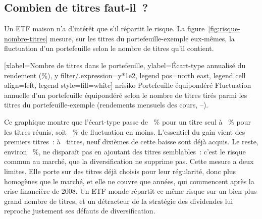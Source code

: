 \subsection{Combien de titres faut-il~?}\label{sec:porte-diversification}

Un ETF maison n'a d'int\'er\^et que s'il r\'epartit le risque. La
figure~\ref{fig:risque-nombre-titres} mesure, sur les titres du portefeuille-exemple eux-m\^emes, la
fluctuation d'un portefeuille selon le nombre de titres qu'il contient.


[xlabel={Nombre de titres dans le portefeuille},
  ylabel={\'Ecart-type annualis\'e du rendement (\%)}, y filter/.expression={y*1e2},
  legend pos=north east, legend cell align=left, legend style={fill=white}]%
  {n}{risiko}%
  {{Portefeuille \'equipond\'er\'e}}%
  {Fluctuation annuelle d'un portefeuille \'equipond\'er\'e selon le nombre de titres tir\'es parmi
  les \NombreTitres{} titres du portefeuille-exemple (rendements mensuels des cours,
  \DonneesDebut--\DonneesFin).\label{fig:risque-nombre-titres}}

Ce graphique montre que l'\'ecart-type passe de \RisqueUnTitre~\% pour un titre seul \`a
\RisqueTousTitres~\% pour les \NombreTitres{} titres r\'eunis, soit \RisqueReductionProzent~\% de
fluctuation en moins. L'essentiel du gain vient des premiers titres~: \`a \TitresNeufDixiemes~titres,
neuf dixi\`emes de cette baisse sont d\'ej\`a acquis. Le reste, environ \RisqueTousTitres~\%, ne
dispara\^it pas en ajoutant des titres semblables~: c'est le risque commun au march\'e, que la
diversification ne supprime pas. Cette mesure a deux limites. Elle porte sur des titres d\'ej\`a
choisis pour leur r\'egularit\'e, donc plus homog\`enes que le march\'e, et elle ne couvre que
\RegleHistoriqueAns{} ann\'ees, qui commencent apr\`es la crise financi\`ere de 2008. Un ETF monde
r\'epartit ce m\^eme risque sur un bien plus grand nombre de titres, et un d\'etracteur de la
strat\'egie des dividendes lui reproche justement ses d\'efauts de
diversification.

